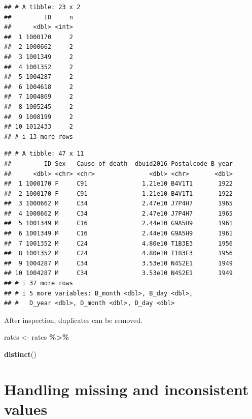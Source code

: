 \documentclass[
  11pt,
  oneside]{book}
\newenvironment{Shaded}{\begin{snugshade}}{\end{snugshade}}
\newcommand{\FunctionTok}[1]{\textcolor[rgb]{0.13,0.29,0.53}{\textbf{#1}}}
\newcommand{\NormalTok}[1]{#1}
\newcommand{\OtherTok}[1]{\textcolor[rgb]{0.56,0.35,0.01}{#1}}
\newcommand{\SpecialCharTok}[1]{\textcolor[rgb]{0.81,0.36,0.00}{\textbf{#1}}}
\begin{document}
\begin{verbatim}
## # A tibble: 23 x 2
##         ID     n
##      <dbl> <int>
##  1 1000170     2
##  2 1000662     2
##  3 1001349     2
##  4 1001352     2
##  5 1004287     2
##  6 1004618     2
##  7 1004869     2
##  8 1005245     2
##  9 1008199     2
## 10 1012433     2
## # i 13 more rows
\end{verbatim}

\begin{Shaded}
\end{Shaded}

\begin{verbatim}
## # A tibble: 47 x 11
##         ID Sex   Cause_of_death  dbuid2016 Postalcode B_year
##      <dbl> <chr> <chr>               <dbl> <chr>       <dbl>
##  1 1000170 F     C91               1.21e10 B4V1T1       1922
##  2 1000170 F     C91               1.21e10 B4V1T1       1922
##  3 1000662 M     C34               2.47e10 J7P4H7       1965
##  4 1000662 M     C34               2.47e10 J7P4H7       1965
##  5 1001349 M     C16               2.44e10 G9A5H9       1961
##  6 1001349 M     C16               2.44e10 G9A5H9       1961
##  7 1001352 M     C24               4.80e10 T1B3E3       1956
##  8 1001352 M     C24               4.80e10 T1B3E3       1956
##  9 1004287 M     C34               3.53e10 N4S2E1       1949
## 10 1004287 M     C34               3.53e10 N4S2E1       1949
## # i 37 more rows
## # i 5 more variables: B_month <dbl>, B_day <dbl>,
## #   D_year <dbl>, D_month <dbl>, D_day <dbl>
\end{verbatim}

After inspection, duplicates can be removed.

\begin{Shaded}
\begin{Highlighting}[]
\NormalTok{rates }\OtherTok{\textless{}{-}}\NormalTok{ rates }\SpecialCharTok{\%\textgreater{}\%}
  
  \FunctionTok{distinct}\NormalTok{()}
\end{Highlighting}
\end{Shaded}

\section{Handling missing and inconsistent values}\label{handling-missing-and-inconsistent-values}
\end{document}
